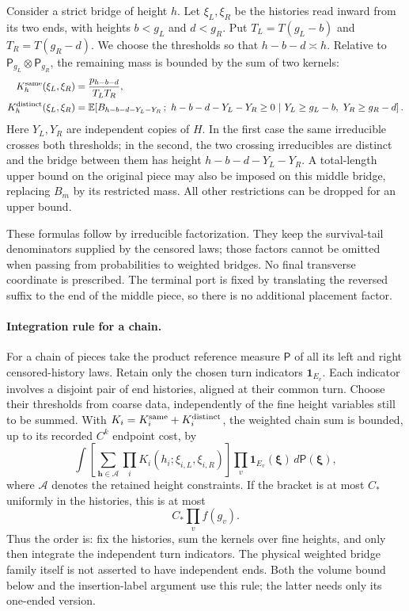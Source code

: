 Consider a strict bridge of height $h$. Let $\xi_L,\xi_R$ be the
histories read inward from its two ends, with heights $b<g_L$ and
$d<g_R$. Put $T_L=T(g_L-b)$ and $T_R=T(g_R-d)$. We choose the
thresholds so that $h-b-d\asymp h$. Relative to
$\mathsf P_{g_L}\otimes\mathsf P_{g_R}$, the remaining mass is bounded
by the sum of two kernels:
\[
\begin{aligned}
 K_h^{\rm same}(\xi_L,\xi_R)
   &=\frac{p_{h-b-d}}{T_LT_R},\\
 K_h^{\rm distinct}(\xi_L,\xi_R)
   &=\mathbb E\!\left[
        B_{h-b-d-Y_L-Y_R}\,;\ h-b-d-Y_L-Y_R\ge0
        \ \middle|\ Y_L\ge g_L-b,\ Y_R\ge g_R-d
      \right].
\end{aligned}
\]
Here $Y_L,Y_R$ are independent copies of $H$. In the first case the
same irreducible crosses both thresholds; in the second, the two
crossing irreducibles are distinct and the bridge between them has
height $h-b-d-Y_L-Y_R$. A total-length upper bound on the original
piece may also be imposed on this middle bridge, replacing $B_m$ by
its restricted mass. All other restrictions can be dropped for an
upper bound.

These formulas follow by irreducible factorization. They keep the
survival-tail denominators supplied by the censored laws; those factors
cannot be omitted when passing from probabilities to weighted bridges.
No final transverse coordinate is prescribed. The terminal port is
fixed by translating the reversed suffix to the end of the middle
piece, so there is no additional placement factor.

\paragraph{Integration rule for a chain.}
For a chain of pieces take the product reference measure $\mathsf P$
of all its left and right censored-history laws. Retain only the chosen
turn indicators $\mathbf1_{E_v}$. Each indicator involves a disjoint
pair of end histories, aligned at their common turn. Choose their
thresholds from coarse data, independently of the fine height variables
still to be summed. With $K_i=K_i^{\rm same}+K_i^{\rm distinct}$, the
weighted chain sum is bounded, up to its recorded $C^k$ endpoint cost,
by
\[
 \int \left[\sum_{\boldsymbol h\in\mathcal A}
                  \prod_i K_i(h_i;\xi_{i,L},\xi_{i,R})\right]
          \prod_v\mathbf1_{E_v}(\boldsymbol\xi)
          \,d\mathsf P(\boldsymbol\xi),
\]
where $\mathcal A$ denotes the retained height constraints. If the
bracket is at most $C_*$ uniformly in the histories, this is at most
\[
 C_*\prod_v f(g_v).
\]
Thus the order is: fix the histories, sum the kernels over fine heights,
and only then integrate the independent turn indicators. The physical
weighted bridge family itself is not asserted to have independent ends.
Both the volume bound below and the insertion-label argument use this
rule; the latter needs only its one-ended version.

